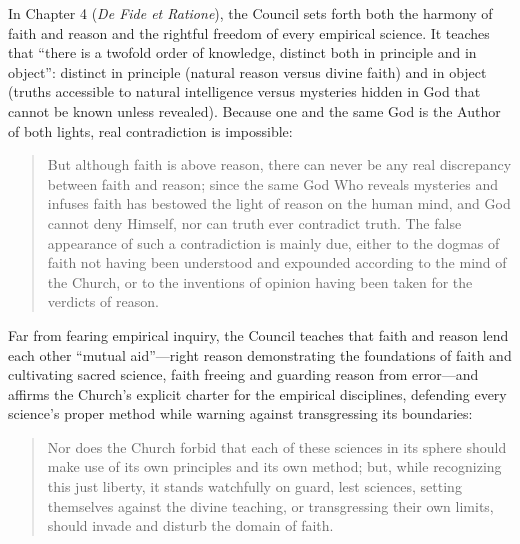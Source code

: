 In Chapter 4 (\emph{De Fide et Ratione}), the Council sets forth both the harmony of faith and reason and the rightful freedom of every empirical science. It teaches that ``there is a twofold order of knowledge, distinct both in principle and in object'': distinct in principle (natural reason versus divine faith) and in object (truths accessible to natural intelligence versus mysteries hidden in God that cannot be known unless revealed). Because one and the same God is the Author of both lights, real contradiction is impossible:

\begin{quote}
But although faith is above reason, there can never be any real discrepancy between faith and reason; since the same God Who reveals mysteries and infuses faith has bestowed the light of reason on the human mind, and God cannot deny Himself, nor can truth ever contradict truth. The false appearance of such a contradiction is mainly due, either to the dogmas of faith not having been understood and expounded according to the mind of the Church, or to the inventions of opinion having been taken for the verdicts of reason.
\end{quote}

Far from fearing empirical inquiry, the Council teaches that faith and reason lend each other ``mutual aid''---right reason demonstrating the foundations of faith and cultivating sacred science, faith freeing and guarding reason from error---and affirms the Church's explicit charter for the empirical disciplines, defending every science's proper method while warning against transgressing its boundaries:

\begin{quote}
Nor does the Church forbid that each of these sciences in its sphere should make use of its own principles and its own method; but, while recognizing this just liberty, it stands watchfully on guard, lest sciences, setting themselves against the divine teaching, or transgressing their own limits, should invade and disturb the domain of faith.
\end{quote}

